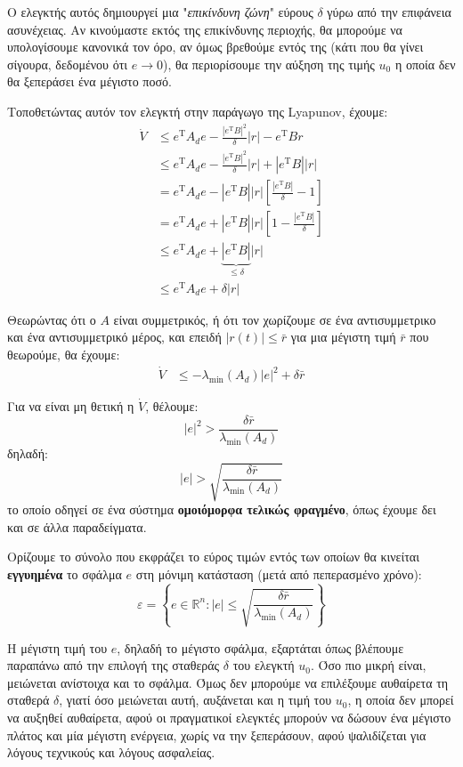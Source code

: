 \documentclass[11pt,a4paper,notitlepage,fleqn]{article}
\let\mytodo\todo
\renewcommand{\todo}[1]{\par\mytodo[inline,noline]{#1}}
\begin{document}
Ο ελεγκτής αυτός δημιουργεί μια "\textit{επικίνδυνη ζώνη}" εύρους \( δ \) γύρω
από την επιφάνεια ασυνέχειας. Αν κινούμαστε εκτός της επικίνδυνης περιοχής, θα μπορούμε να υπολογίσουμε κανονικά τον όρο, αν όμως βρεθούμε
εντός της (κάτι που θα γίνει σίγουρα, δεδομένου ότι \( e\to 0 \)),
θα περιορίσουμε την αύξηση της τιμής \( u_0 \) η οποία δεν θα ξεπεράσει
ένα μέγιστο ποσό.

\todo{Graph 41}

Τοποθετώντας αυτόν τον ελεγκτή στην παράγωγο της Lyapunov, έχουμε:
\begin{align*}
	\dot V &\leq e^{\mathrm T} A_d e - \frac{\left|e^{\mathrm T} B\right|^2}{\delta}|r| - e^{\mathrm T} B r
	\\ &\leq e^{\mathrm T} A_d e - \frac{\left| e^{\mathrm T} B \right|^2}{\delta} |r| + \left| e^{\mathrm T} B \right||r|
	\\ &= e^{\mathrm T} A_d e - \left| e^{\mathrm T}B \right||r|
	\left[
	\frac{\left| e^{\mathrm T}B \right|}{\delta} - 1
	\right]
	\\ &= e^{\mathrm T} A_d e + \left| e^{\mathrm T}B \right||r|\left[
	1 - \frac{\left| e^{\mathrm T} B \right|}{\delta}
	\right]
	\\ &\leq e^{\mathrm T} A_d e + \underbrace{\left| e^{\mathrm T} B \right|}_{\leq \delta}|r|
	\\ &\leq e^{\mathrm T} A_d e + \delta |r|
\end{align*}

Θεωρώντας ότι ο \( A \) είναι συμμετρικός, ή ότι τον χωρίζουμε σε ένα
αντισυμμετρικο και ένα αντισυμμετρικό μέρος,
και επειδή \( |r(t)| \leq \bar r \) για μια μέγιστη τιμή \( \bar r \)
που θεωρούμε,
θα έχουμε:
\begin{align*}
	\dot V &\leq - \lambda_{\min}(A_d) |e|^2 + \delta \bar r
\end{align*}

Για να είναι μη θετική η \( \dot V \), θέλουμε:
\[
|e|^2 > \frac{\delta \bar r}{\lambda_{\min}(A_d)}
\]
δηλαδή:
\[
|e| > \sqrt{\frac{
	\delta \bar r}{\lambda_{\min} (A_d) }}
\]
το οποίο οδηγεί σε ένα σύστημα \textbf{ομοιόμορφα τελικώς φραγμένο}, όπως
έχουμε δει και σε άλλα παραδείγματα.

Ορίζουμε το σύνολο που εκφράζει το εύρος τιμών εντός των οποίων θα κινείται \textbf{εγγυημένα} το σφάλμα \( e \) στη μόνιμη κατάσταση (μετά από πεπερασμένο χρόνο):
\[
\varepsilon = \left\lbrace
e \in \mathbb R^n :
|e| \leq \sqrt{
\frac{\delta \bar r}{\lambda_{\min} (A_d)}
}
 \right\rbrace
\]

Η μέγιστη τιμή του \( e \), δηλαδή το μέγιστο σφάλμα, εξαρτάται όπως βλέπουμε παραπάνω από την επιλογή της σταθεράς \( \delta \) του ελεγκτή \( u_0 \). Όσο πιο μικρή είναι, μειώνεται ανίστοιχα και το σφάλμα. Όμως δεν μπορούμε να επιλέξουμε αυθαίρετα τη σταθερά \( \delta \), γιατί όσο μειώνεται αυτή, αυξάνεται και η τιμή του \( u_0 \), η οποία δεν μπορεί να αυξηθεί αυθαίρετα, αφού οι πραγματικοί ελεγκτές μπορούν να δώσουν ένα μέγιστο πλάτος και μία μέγιστη ενέργεια, χωρίς να την ξεπεράσουν, αφού ψαλιδίζεται για λόγους τεχνικούς και λόγους ασφαλείας.
\end{document}
